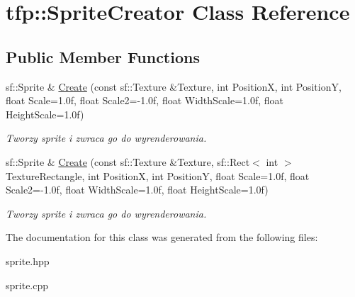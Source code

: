 \hypertarget{classtfp_1_1_sprite_creator}{}\section{tfp\+:\+:Sprite\+Creator Class Reference}
\label{classtfp_1_1_sprite_creator}
\subsection*{Public Member Functions}
\begin{DoxyCompactItemize}
\item 
\mbox{\label{classtfp_1_1_sprite_creator_ae312f0b82cdb45dd22a9114e45c6b56a}} 
sf\+::\+Sprite \& \mbox{\hyperlink{classtfp_1_1_sprite_creator_ae312f0b82cdb45dd22a9114e45c6b56a}{Create}} (const sf\+::\+Texture \&Texture, int PositionX, int PositionY, float Scale=1.\+0f, float Scale2=-\/1.\+0f, float Width\+Scale=1.\+0f, float Height\+Scale=1.\+0f)
\begin{DoxyCompactList}\small\item\em Tworzy sprite i zwraca go do wyrenderowania. \end{DoxyCompactList}\item 
\mbox{\label{classtfp_1_1_sprite_creator_ac755937551beaca03007abd3655c3b64}} 
sf\+::\+Sprite \& \mbox{\hyperlink{classtfp_1_1_sprite_creator_ac755937551beaca03007abd3655c3b64}{Create}} (const sf\+::\+Texture \&Texture, sf\+::\+Rect$<$ int $>$ Texture\+Rectangle, int PositionX, int PositionY, float Scale=1.\+0f, float Scale2=-\/1.\+0f, float Width\+Scale=1.\+0f, float Height\+Scale=1.\+0f)
\begin{DoxyCompactList}\small\item\em Tworzy sprite i zwraca go do wyrenderowania. \end{DoxyCompactList}\end{DoxyCompactItemize}


The documentation for this class was generated from the following files\+:\begin{DoxyCompactItemize}
\item 
sprite.\+hpp\item 
sprite.\+cpp\end{DoxyCompactItemize}
